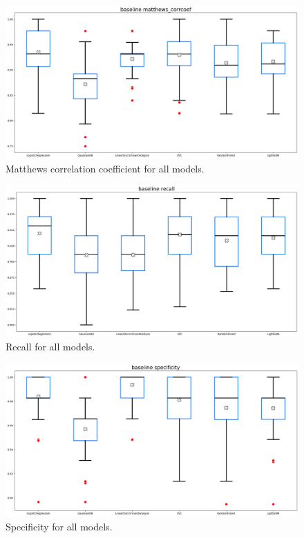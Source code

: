 \documentclass[12pt]{article}
\begin{document}
\begin{figure}[H]
    \centering
    \includegraphics[width=\textwidth]{ims/baseline_mcc.png}
    \caption{Matthews correlation coefficient for all models.}
    \label{fig:baseline_mcc}
\end{figure}

\begin{figure}[H]
    \centering
    \includegraphics[width=\textwidth]{ims/baseline_recall.png}
    \caption{Recall for all models.}
    \label{fig:baseline_recall}
\end{figure}

\begin{figure}[H]
    \centering
    \includegraphics[width=\textwidth]{ims/baseline_specificity.png}
    \caption{Specificity for all models.}
    \label{fig:baseline_specificity}
\end{figure}
\end{document}
